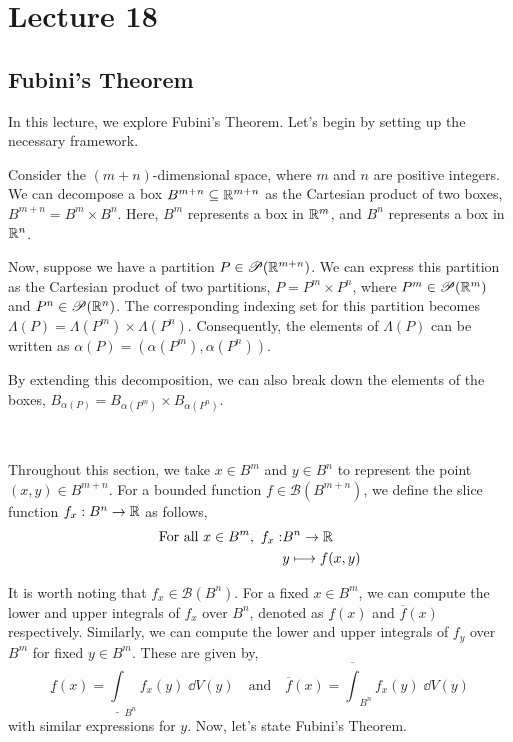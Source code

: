 \documentclass[../Analysis-3.tex]{subfiles}
\begin{document}
\chapter*{Lecture 18} %
\setcounter{chapter}{18} %
\setcounter{section}{0}
\setcounter{equation}{0}
\setcounter{figure}{0}


\section{Fubini's Theorem}

In this lecture, we explore Fubini's Theorem. Let's begin by setting up the necessary framework.

\ssk

Consider the $(m+n)$-dimensional space, where $m$ and $n$ are positive integers. We can decompose a box $B^{m+n} \subseteq \mathbb{R}^{m+n}$ as the Cartesian product of two boxes, $B^{m+n} = B^m \times B^n$. Here, $B^m$ represents a box in $\mathbb{R}^m$, and $B^n$ represents a box in $\mathbb{R}^n$.

\ssk

Now, suppose we have a partition $P \in \mathscr{P}(\mathbb{R}^{m+n})$. We can express this partition as the Cartesian product of two partitions, $P = P^m \times P^n$, where $P^m \in \mathscr{P}(\mathbb{R}^m)$ and $P^n \in \mathscr{P}(\mathbb{R}^n)$. The corresponding indexing set for this partition becomes $\Lambda(P) = \Lambda(P^m) \times \Lambda(P^n)$. Consequently, the elements of $\Lambda(P)$ can be written as $\alpha(P) = (\alpha(P^m), \alpha(P^n))$.

\ssk

By extending this decomposition, we can also break down the elements of the boxes, $B_{\alpha(P)} = B_{\alpha(P^m)} \times B_{\alpha(P^n)}$.

\

Throughout this section, we take $x \in B^m$ and $y \in B^n$ to represent the point $(x,y) \in B^{m+n}$. For a bounded function $f \in \mathscr{B}(B^{m+n})$, we define the slice function $f_x: B^n \to \mathbb{R}$ as follows,
\begin{align*}
  \text{For all } x \in B^m, \ f_x : & B^n \to \mathbb{R}           \\
                                     & y \longmapsto f(x,y)
\end{align*}

It is worth noting that $f_x \in \mathscr{B}(B^n)$. For a fixed $x \in B^m$, we can compute the lower and upper integrals of $f_x$ over $B^n$, denoted as $\underline{f}(x)$ and $\overline{f}(x)$ respectively. Similarly, we can compute the lower and upper integrals of $f_y$ over $B^m$ for fixed $y \in B^m$. These are given by,
\[  \underline{f}(x) = \underline{\int}_{B^n} f_x(y) \; \dd{V(y)} \quad \text{and} \quad \overline{f}(x) = \overline{\int}_{B^n} f_x(y) \; \dd{V(y)}  \]
with similar expressions for $y$. Now, let's state Fubini's Theorem.
\end{document}
